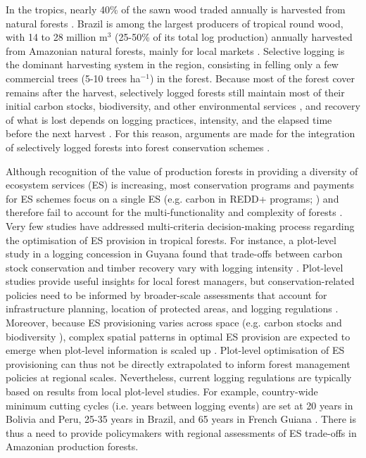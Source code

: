 \documentclass[12pt]{article}
\begin{document}
In the tropics, nearly 40\% of the sawn wood traded annually is harvested from natural forests \cite{Payn2015}. Brazil is among the largest producers of tropical round wood, with 14 to 28 million m$^3$ (25-50\% of its total log production) annually harvested from Amazonian natural forests, mainly for local markets \cite{SFB2010,Santos2013,FAOstat2018}. Selective logging is the dominant harvesting system in the region, consisting in felling only a few commercial trees (5-10 trees ha$^{-1}$) in the forest. Because most of the forest cover remains after the harvest, selectively logged forests still maintain most of their initial carbon stocks, biodiversity, and other environmental services \cite{Putz2012}, and recovery of what is lost depends on logging practices, intensity, and the elapsed time before the next harvest \cite{Rutishauser2015,Piponiot2018}. For this reason, arguments are made for the integration of selectively logged forests into forest conservation schemes \cite{Edwards2014a}.  

Although recognition of the value of production forests in providing a diversity of ecosystem services (ES) is increasing, most conservation programs and payments for ES schemes focus on a single ES (e.g. carbon in REDD+ programs; \cite{Laing2016}) and therefore fail to account for the multi-functionality and complexity of forests \cite{VanderPlas2017}. Very few studies have addressed multi-criteria decision-making process regarding the optimisation of ES provision in tropical forests. For instance, a plot-level study in a logging concession in Guyana found that trade-offs between carbon stock conservation and timber recovery vary with logging intensity \cite{Roopsind2018}. Plot-level studies provide useful insights for local forest managers, but conservation-related policies need to be informed by broader-scale assessments that account for infrastructure planning, location of protected areas, and logging regulations \cite{Hein2006b}. Moreover, because ES provisioning varies across space (e.g. carbon stocks \cite{Avitabile2016} and biodiversity \cite{Jenkins2013}), complex spatial patterns in optimal ES provision are expected to emerge when plot-level information is scaled up \cite{Gibson2000}. Plot-level optimisation of ES provisioning can thus not be directly extrapolated to inform forest management policies at regional scales. Nevertheless, current logging regulations are typically based on results from local plot-level studies. For example, country-wide minimum cutting cycles (i.e. years between logging events) are set at 20 years in Bolivia and Peru, 25-35 years in Brazil, and 65 years in French Guiana \cite{Blaser2011}. There is thus a need to provide policymakers with regional assessments of ES trade-offs in Amazonian production forests.  
\end{document}
